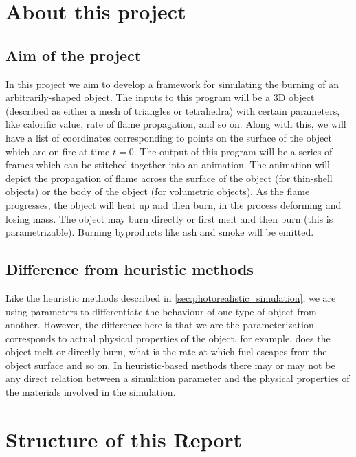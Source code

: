 \documentclass[a4paper]{report}
\begin{document}

\section{About this project} %
\label{sec:about_this_project}

\subsection{Aim of the project}

In this project we aim to develop a framework for simulating the burning of an arbitrarily-shaped object. The inputs to this program will be a 3D object (described as either a mesh of triangles or tetrahedra) with certain parameters, like calorific value, rate of flame propagation, and so on. Along with this, we will have a list of coordinates corresponding to points on the surface of the object which are on fire at time $t = 0$. The output of this program will be a series of frames which can be stitched together into an animation. The animation will depict the propagation of flame across the surface of the object (for thin-shell objects) or the body of the object (for volumetric objects). As the flame progresses, the object will heat up and then burn, in the process deforming and losing mass. The object may burn directly or first melt and then burn (this is parametrizable). Burning byproducts like ash and smoke will be emitted.

\subsection{Difference from heuristic methods}

Like the heuristic methods described in \ref{sec:photorealistic_simulation}, we are using parameters to differentiate the behaviour of one type of object from another. However, the difference here is that we are the parameterization corresponds to actual physical properties of the object, for example, does the object melt or directly burn, what is the rate at which fuel escapes from the object surface and so on. In heuristic-based methods there may or may not be any direct relation between a simulation parameter and the physical properties of the materials involved in the simulation.


\section{Structure of this Report} %
\label{sec:structure_of_this_report}
\end{document}
